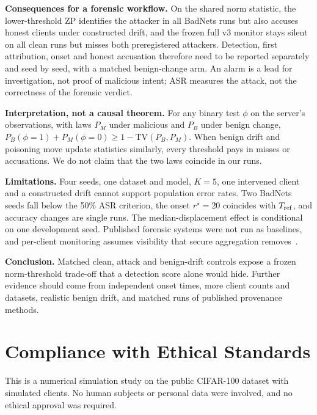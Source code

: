 \documentclass{article}
\begin{document}
\textbf{Consequences for a forensic workflow.} On the shared norm statistic, the lower-threshold ZP identifies the attacker in all BadNets runs but also accuses honest clients under constructed drift, and the frozen full v3 monitor stays silent on all clean runs but misses both preregistered attackers. Detection, first attribution, onset and honest accusation therefore need to be reported separately and seed by seed, with a matched benign-change arm. An alarm is a lead for investigation, not proof of malicious intent; ASR measures the attack, not the correctness of the forensic verdict.

\textbf{Interpretation, not a causal theorem.} For any binary test $\phi$ on the server's observations, with laws $P_M$ under malicious and $P_B$ under benign change, $P_B(\phi{=}1)+P_M(\phi{=}0)\ge 1-\mathrm{TV}(P_B,P_M)$. When benign drift and poisoning move update statistics similarly, every threshold pays in misses or accusations. We do not claim that the two laws coincide in our runs.

\textbf{Limitations.} Four seeds, one dataset and model, $K=5$, one intervened client and a constructed drift cannot support population error rates. Two BadNets seeds fall below the 50\% ASR criterion, the onset $r^\star=20$ coincides with $T_{\rm ref}$, and accuracy changes are single runs. The median-displacement effect is conditional on one development seed. Published forensic systems were not run as baselines, and per-client monitoring assumes visibility that secure aggregation removes~\cite{xhemrishi2025fedgt}.

\textbf{Conclusion.} Matched clean, attack and benign-drift controls expose a frozen norm-threshold trade-off that a detection score alone would hide. Further evidence should come from independent onset times, more client counts and datasets, realistic benign drift, and matched runs of published provenance methods.

\section{Compliance with Ethical Standards}
This is a numerical simulation study on the public CIFAR-100 dataset with simulated clients. No human subjects or personal data were involved, and no ethical approval was required.
\end{document}
